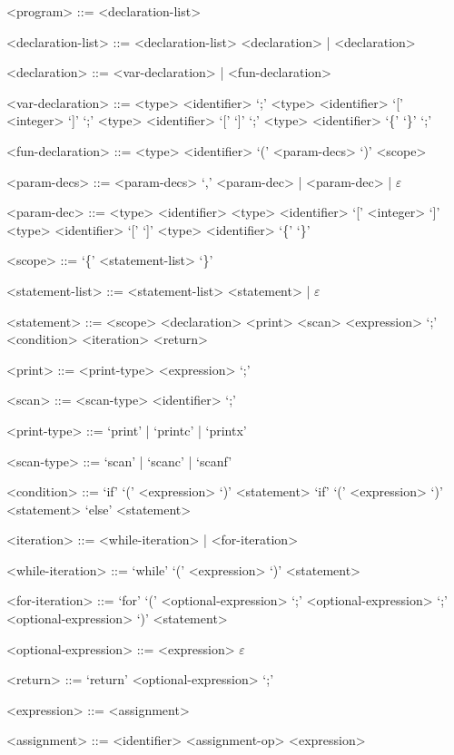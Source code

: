\documentclass[
	article,			%
	11pt,				%
	oneside,			%
	a4paper,			%
	english,			%
	brazil,				%
	sumario=tradicional
	]{abntex2}
\begin{document}
\begin{grammar}
	
	<program> ::= <declaration-list>
		
	<declaration-list> ::= <declaration-list> <declaration> | <declaration>
	
	<declaration> ::= <var-declaration> | <fun-declaration>
	
	<var-declaration> ::= <type> <identifier> `;'
	\alt <type> <identifier> `[' <integer> `]' `;'
	\alt <type> <identifier> `[' `]' `;'
	\alt <type> <identifier> `\{' `\}' `;'
	
	<fun-declaration> ::= <type> <identifier> `(' <param-decs> `)' <scope>
		
	<param-decs> ::= <param-decs> `,' <param-dec> | <param-dec> | $\varepsilon$
	
	<param-dec> ::= <type> <identifier>
	\alt <type> <identifier> `[' <integer> `]'
	\alt <type> <identifier> `[' `]'
	\alt <type> <identifier> `\{' `\}'
	
	<scope> ::= `\{' <statement-list> `\}'
	
	<statement-list> ::= <statement-list> <statement> | $\varepsilon$
	
	<statement> ::= <scope>
	\alt <declaration>
	\alt <print>
	\alt <scan>
	\alt <expression> `;'
	\alt <condition>
	\alt <iteration>
	\alt <return>
	
	<print> ::= <print-type> <expression> `;'

	<scan> ::= <scan-type> <identifier> `;'

	<print-type> ::= `print' | `printc' | `printx'

	<scan-type> ::= `scan' | `scanc' | `scanf'	

	<condition> ::= `if' `(' <expression> `)' <statement>
	\alt `if' `(' <expression> `)' <statement> `else' <statement>
		
	<iteration> ::= <while-iteration> | <for-iteration>

	<while-iteration> ::= `while' `(' <expression> `)' <statement>
	
	<for-iteration> ::= `for' `(' <optional-expression> `;' <optional-expression> `;' <optional-expression> `)' <statement>

	<optional-expression> ::= <expression>
	\alt $\varepsilon$

	<return> ::= `return' <optional-expression> `;'
	
	<expression> ::= <assignment>

	<assignment> ::= <identifier> <assignment-op> <expression>
	\alt <and-expression>
	

\end{grammar}
\end{document}
